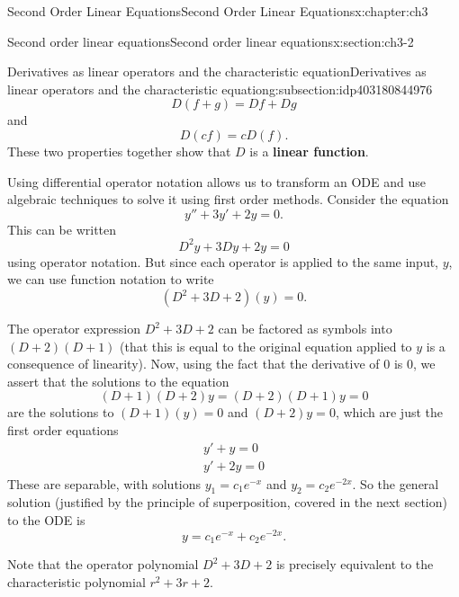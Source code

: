 \documentclass[oneside,10pt,]{book}
\newcommand{\terminology}[1]{\textbf{#1}}
\numberwithin{equation}{section}
\numberwithin{equation}{section}
\begin{document}
\begin{chapterptx}{Second Order Linear Equations}{}{Second Order Linear Equations}{}{}{x:chapter:ch3}
\begin{sectionptx}{Second order linear equations}{}{Second order linear equations}{}{}{x:section:ch3-2}
\begin{subsectionptx}{Derivatives as linear operators and the characteristic equation}{}{Derivatives as linear operators and the characteristic equation}{}{}{g:subsection:idp403180844976}
\begin{equation*}
D(f + g) = Df + Dg
\end{equation*}
and%
\begin{equation*}
D(cf) = cD(f).
\end{equation*}
These two properties together show that \(D\) is a \terminology{linear function}.%
\par
Using differential operator notation allows us to transform an ODE and use algebraic techniques to solve it using first order methods. Consider the equation%
\begin{equation*}
y'' + 3 y ' + 2 y = 0.
\end{equation*}
This can be written%
\begin{equation*}
D^2 y + 3 D y + 2 y = 0
\end{equation*}
using operator notation. But since each operator is applied to the same input, \(y\), we can use function notation to write%
\begin{equation*}
(D^2 + 3D + 2)(y) = 0.
\end{equation*}
%
\par
The operator expression \(D^2 + 3D + 2\) can be factored as symbols into \((D + 2)(D + 1)\) (that this is equal to the original equation applied to \(y\) is a consequence of linearity). Now, using the fact that the derivative of 0 is 0, we assert that the solutions to the equation%
\begin{equation*}
(D + 1)(D + 2)y = (D + 2)(D+1)y = 0
\end{equation*}
are the solutions to \((D + 1)(y) = 0\) and \((D + 2)y = 0\), which are just the first order equations%
\begin{gather*}
y' + y = 0\\
y' + 2y = 0
\end{gather*}
These are separable, with solutions \(y_1 = c_1 e^{-x}\) and \(y_2 = c_2 e^{-2x}\). So the general solution (justified by the principle of superposition, covered in the next section) to the ODE is%
\begin{equation*}
y = c_1 e^{-x} + c_2 e^{-2x}.
\end{equation*}
%
\par
Note that the operator polynomial \(D^2 + 3D + 2\) is precisely equivalent to the characteristic polynomial \(r^2 + 3r + 2\).%
\end{subsectionptx}
\end{sectionptx}
%
%
\typeout{************************************************}

\end{chapterptx}
\end{document}
